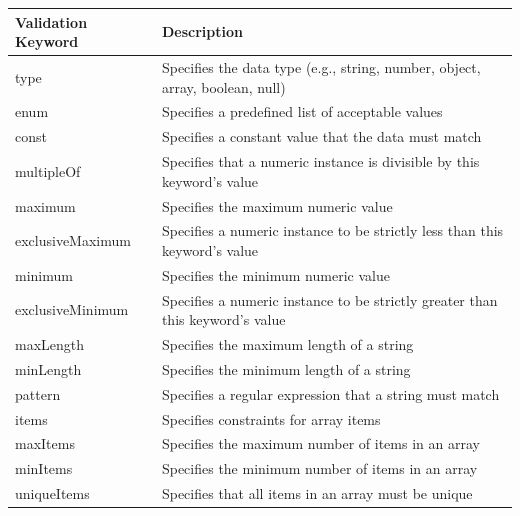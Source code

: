 \begin{table}[h!]
\centering
	\begin{tabular}{|l|p{10cm}|}
		\hline
		\textbf{Validation Keyword} & \textbf{Description}                                                          \\
		\hline
		type                        & Specifies the data type (e.g., string, number, object, array, boolean, null)  \\
		\hline
		enum                        & Specifies a predefined list of acceptable values                              \\
		\hline
		const                       & Specifies a constant value that the data must match                           \\
		\hline
		multipleOf                  & Specifies that a numeric instance is divisible by this keyword's value        \\
		\hline
		maximum                     & Specifies the maximum numeric value                                           \\
		\hline
		exclusiveMaximum            & Specifies a numeric instance to be strictly less than this keyword's value    \\
		\hline
		minimum                     & Specifies the minimum numeric value                                           \\
		\hline
		exclusiveMinimum            & Specifies a numeric instance to be strictly greater than this keyword's value \\
		\hline
		maxLength                   & Specifies the maximum length of a string                                      \\
		\hline
		minLength                   & Specifies the minimum length of a string                                      \\
		\hline
		pattern                     & Specifies a regular expression that a string must match                       \\
		\hline
		items                       & Specifies constraints for array items                                         \\
		\hline
		maxItems                    & Specifies the maximum number of items in an array                             \\
		\hline
		minItems                    & Specifies the minimum number of items in an array                             \\
		\hline
		uniqueItems                 & Specifies that all items in an array must be unique                           \\

\end{tabular}
\end{table}
